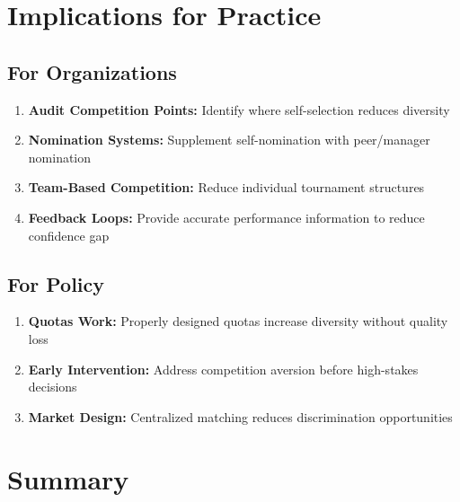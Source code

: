 \section{Implications for Practice}

\subsection{For Organizations}

\begin{enumerate}
    \item \textbf{Audit Competition Points:} Identify where self-selection reduces diversity
    \item \textbf{Nomination Systems:} Supplement self-nomination with peer/manager nomination
    \item \textbf{Team-Based Competition:} Reduce individual tournament structures
    \item \textbf{Feedback Loops:} Provide accurate performance information to reduce confidence gap
\end{enumerate}

\subsection{For Policy}

\begin{enumerate}
    \item \textbf{Quotas Work:} Properly designed quotas increase diversity without quality loss
    \item \textbf{Early Intervention:} Address competition aversion before high-stakes decisions
    \item \textbf{Market Design:} Centralized matching reduces discrimination opportunities
\end{enumerate}

\section{Summary}

